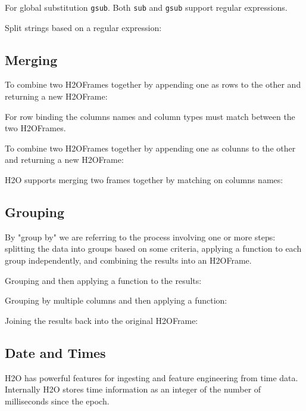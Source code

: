 For global substitution {\texttt{gsub}}.  Both {\texttt{sub}} and {\texttt{gsub}} support regular expressions.

Split strings based on a regular expression:



\subsection{Merging}
To combine two H2OFrames together by appending one as rows to the other and returning a new H2OFrame:


For row binding the columns names and column types must match between the two H2OFrames.

To combine two H2OFrames together by appending one as colunns to the other
and returning a new H2OFrame:


H2O supports merging two frames together by matching on columns names:


\subsection{Grouping}
By "group by" we are referring to the process involving one or more steps: splitting the
data into groups based on some criteria, applying a function to each group independently,
and combining the results into an H2OFrame.

Grouping and then applying a function to the results:


Grouping by multiple columns and then applying a function:


Joining the results back into the original H2OFrame:


\subsection{Date and Times}
H2O has powerful features for ingesting and feature engineering from time data.  Internally H2O
stores time information as an integer of the number of milliseconds since the epoch.

